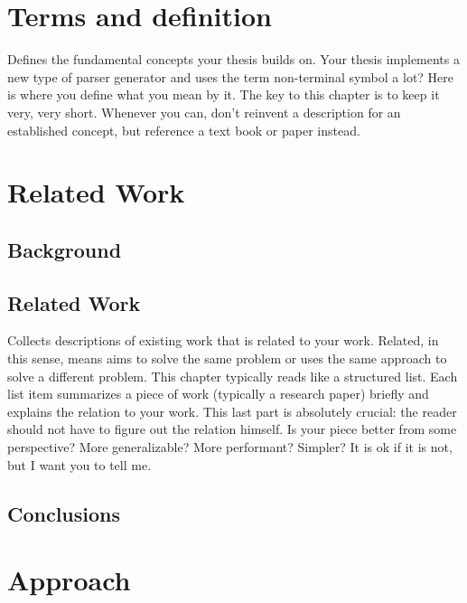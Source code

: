 \documentclass[12pt]{article}
\begin{document}
\pagebreak
\section{Terms and definition}
\label{sec:2}
Defines the fundamental concepts your thesis builds on. Your thesis implements a new type of parser generator and uses the term non-terminal symbol a lot? 
Here is where you define what you mean by it. The key to this chapter is to keep it very, very short. 
Whenever you can, don’t reinvent a description for an established concept, but reference a text book or paper instead.
\pagebreak
\section{Related Work}
\label{sec:3}


\subsection{Background}
\label{sub:background}


\subsection{Related Work}
\label{sub:covert}

Collects descriptions of existing work that is related to your work. Related, in this sense, means aims to solve the same problem or uses the same approach to solve a different problem. 
This chapter typically reads like a structured list. Each list item summarizes a piece of work (typically a research paper) briefly and explains the relation to your work. 
This last part is absolutely crucial: the reader should not have to figure out the relation himself.
Is your piece better from some perspective? More generalizable? More performant? Simpler? It is ok if it is not, but I want you to tell me.

\subsection{Conclusions}

\pagebreak

\section{Approach}
\label{sec:4}
\end{document}
